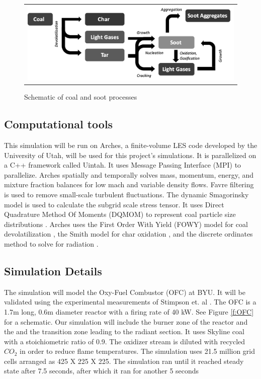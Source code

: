\documentclass[12pt]{wssci}
\begin{document}
\begin{figure}
\begin{center}
\begin{tabular}{c}
\includegraphics[width=4 in]{../figures/soot_model_Diagram2_bw.png}
\end{tabular}
\caption{Schematic of coal and soot processes}
\label{f:soot}
\end{center}
\end{figure}	

\subsection{Computational tools}
	This simulation will be run on Arches, a finite-volume LES code developed by the University of Utah, will be used for this project's simulations. It is parallelized on a C++ framework called Uintah.  It uses Message Passing Interface (MPI) to parallelize. Arches spatially and temporally solves mass, momentum, energy, and mixture fraction balances for low mach and variable density flows.  Favre filtering is used to remove small-scale turbulent fluctuations.  The dynamic Smagorinsky model is used to calculate the subgrid scale stress tensor.    It uses Direct Quadrature Method Of Moments (DQMOM) to represent coal particle size distributions  \cite{Pedel2012} \cite{Abboud2015} \cite{Marchisio2005}.  Arches uses the First Order With Yield (FOWY) model for coal devolatilization \cite{Schroeder2015}, the Smith model for char oxidation \cite{Smith1980}, and the discrete ordinates method to solve for radiation \cite{Modest2013541}.  


\subsection{Simulation Details}

The simulation will model the Oxy-Fuel Combustor (OFC) at BYU.  It will be validated using the experimental measurements of Stimpson et. al \cite{Stimpson2013}.  The OFC is a 1.7m long, 0.6m diameter reactor with a firing rate of 40 kW.  See Figure \ref{f:OFC} for a schematic.  Our simulation will include the burner zone of the reactor and the and the transition zone leading to the radiant section.  It uses Skyline coal with a stoichiometric ratio of 0.9.  The oxidizer stream is diluted with recycled $CO_2$ in order to reduce flame temperatures.  The simulation uses 21.5 million grid cells arranged as 425 X 225 X 225.  The simulation ran until it reached steady state after 7.5 seconds, after which it ran for another 5 seconds %
\end{document}
